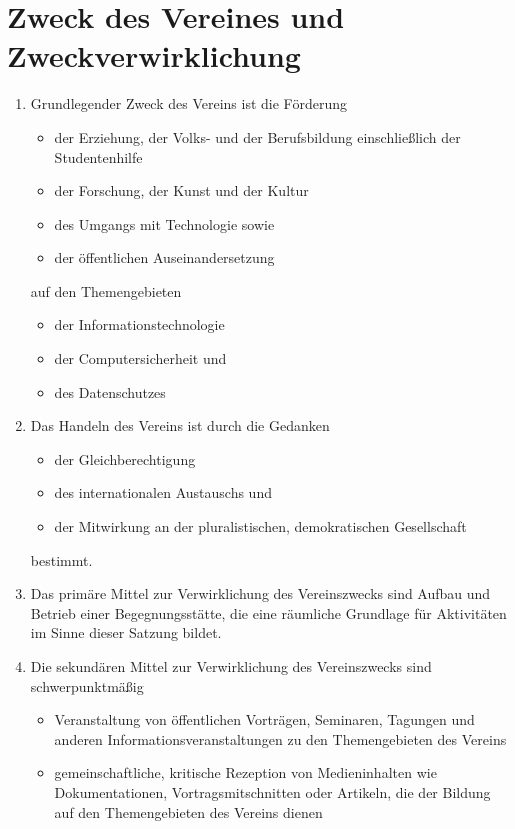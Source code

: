 \documentclass[fontsize=12pt,paper=a4,pagesize]{scrartcl}
\begin{document}
\section{Zweck des Vereines und Zweckverwirklichung}
\begin{enumerate}
	\item Grundlegender Zweck des Vereins ist die Förderung
		\begin{itemize}
			\item der Erziehung, der Volks- und der Berufsbildung einschließlich
				  der Studentenhilfe
			\item der Forschung, der Kunst und der Kultur
			\item des Umgangs mit Technologie sowie
			\item der öffentlichen Auseinandersetzung
		\end{itemize}
		auf den Themengebieten
		\begin{itemize}
			\item der Informationstechnologie
			\item der Computersicherheit und
			\item des Datenschutzes
		\end{itemize}

	\item Das Handeln des Vereins ist durch die Gedanken
		\begin{itemize}
			\item der Gleichberechtigung
			\item des internationalen Austauschs und
			\item der Mitwirkung an der pluralistischen, demokratischen
				Gesellschaft
		\end{itemize}
		bestimmt.

	\item Das primäre Mittel zur Verwirklichung des Vereinszwecks sind
		Aufbau und Betrieb einer Begegnungsstätte, die eine räumliche
		Grundlage für Aktivitäten im Sinne dieser Satzung bildet.

	\item Die sekundären Mittel zur Verwirklichung des Vereinszwecks sind
		schwerpunktmäßig

	\begin{itemize}
		\item Veranstaltung von öffentlichen Vorträgen, Seminaren, Tagungen und
			anderen Informationsveranstaltungen zu den Themengebieten
			des Vereins

		\item gemeinschaftliche, kritische Rezeption von Medieninhalten
			wie Dokumentationen, Vortragsmitschnitten oder Artikeln, die der
			Bildung auf den Themengebieten des Vereins dienen


\end{itemize}
\end{enumerate}
\end{document}
